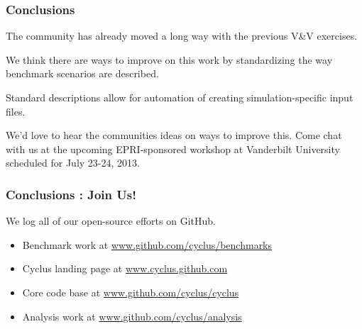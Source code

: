 
\begin{frame}
  \frametitle{Conclusions}
  The community has already moved a long way with the previous V\&V exercises.

  \vspace{0.4cm}

  We think there are ways to improve on this work by standardizing the way
  benchmark scenarios are described.

  \vspace{0.4cm}

  Standard descriptions allow for automation of creating simulation-specific
  input files.

  \vspace{0.4cm}

  We'd love to hear the communities ideas on ways to improve this. Come chat
  with us at the upcoming EPRI-sponsored workshop at Vanderbilt University
  scheduled for July 23-24, 2013.
\end{frame}

\begin{frame}
  \frametitle{Conclusions : Join Us!}
  We log all of our open-source efforts on GitHub.

  \begin{itemize}
    \item Benchmark work at \url{www.github.com/cyclus/benchmarks}
    \item Cyclus landing page at \url{www.cyclus.github.com}
    \item Core code base at \url{www.github.com/cyclus/cyclus}
    \item Analysis work at \url{www.github.com/cyclus/analysis}
  \end{itemize}

\end{frame}
